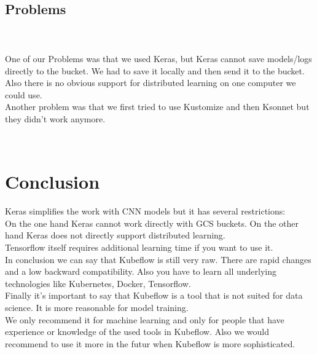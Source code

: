 \documentclass[
	12pt, %
]{fphw}
\begin{document}
\ \\ 
\subsection*{Problems}
\ \\  \ \\
\noindent One of our Problems was that we used Keras, but Keras cannot save models/logs directly to the bucket. We had to save it locally and then send it to the bucket. \\
Also there is no obvious support for distributed learning on one computer we could use. \\

\noindent Another problem was that we first tried to use Kustomize and then Ksonnet but they didn't work anymore.

\ \\
\section{Conclusion}

\noindent Keras simplifies the work with CNN models but it has several restrictions: \\
On the one hand Keras cannot work directly with GCS buckets. On the other hand Keras does not directly support distributed learning. \\

\noindent Tensorflow itself requires additional learning time if you want to use it.\\

\noindent In conclusion we can say that Kubeflow is still very raw. There are rapid changes and a low backward compatibility. Also you have to learn all underlying technologies like Kubernetes, Docker, Tensorflow.\\
Finally it's important to say that Kubeflow is a tool that is not suited for data science. It is more reasonable for model training. \\

\noindent We only recommend it for machine learning and only for people that have experience or knowledge of the used tools in Kubeflow. Also we would recommend to use it more in the futur when Kubeflow is more sophisticated.
\ \\
{}

\end{document}
